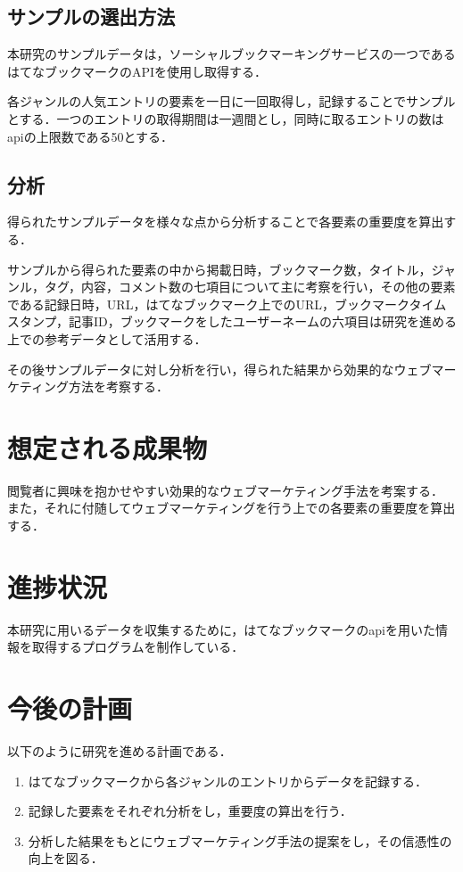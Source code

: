 \documentclass[uplatex,twocolumn,dvipdfmx]{jsarticle}
\begin{document}
\subsection{サンプルの選出方法}
本研究のサンプルデータは，ソーシャルブックマーキングサービスの一つであるはてなブックマークのAPI\cite{hatena}を使用し取得する．\par
各ジャンルの人気エントリの要素を一日に一回取得し，記録することでサンプルとする．一つのエントリの取得期間は一週間とし，同時に取るエントリの数はapiの上限数である50とする．
\subsection{分析}
得られたサンプルデータを様々な点から分析することで各要素の重要度を算出する．\par
サンプルから得られた要素の中から掲載日時，ブックマーク数，タイトル，ジャンル，タグ，内容，コメント数の七項目について主に考察を行い，その他の要素である記録日時，URL，はてなブックマーク上でのURL，ブックマークタイムスタンプ，記事ID，ブックマークをしたユーザーネームの六項目は研究を進める上での参考データとして活用する．\par
その後サンプルデータに対し分析を行い，得られた結果から効果的なウェブマーケティング方法を考察する．


\section{想定される成果物}

閲覧者に興味を抱かせやすい効果的なウェブマーケティング手法を考案する．
また，それに付随してウェブマーケティングを行う上での各要素の重要度を算出する．


\section{進捗状況}

本研究に用いるデータを収集するために，はてなブックマークのapiを用いた情報を取得するプログラムを制作している．

\section{今後の計画}
以下のように研究を進める計画である．

\begin{enumerate}
\item はてなブックマークから各ジャンルのエントリからデータを記録する．
\item 記録した要素をそれぞれ分析をし，重要度の算出を行う．
\item 分析した結果をもとにウェブマーケティング手法の提案をし，その信憑性の向上を図る．
\end{enumerate}



\end{document}
